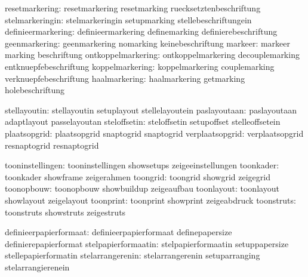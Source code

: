                resetmarkering:  resetmarkering               resetmarking
                                ruecksetztenbeschriftung
              stelmarkeringin:  stelmarkeringin              setupmarking
                                stellebeschriftungein
           definieermarkering:  definieermarkering           definemarking
                                definierebeschriftung
                geenmarkering:  geenmarkering                nomarking
                                keinebeschriftung
                      markeer:  markeer                      marking
                                beschriftung
           ontkoppelmarkering:  ontkoppelmarkering           decouplemarking
                                entknuepfebeschriftung
              koppelmarkering:  koppelmarkering              couplemarking
                                verknuepfebeschriftung
                haalmarkering:  haalmarkering                getmarking
                                holebeschriftung

                 stellayoutin:  stellayoutin                 setuplayout
                                stellelayoutein
                 paslayoutaan:  paslayoutaan                 adaptlayout
                                passelayoutan
                 steloffsetin:  steloffsetin                 setupoffset
                                stelleoffsetein
                 plaatsopgrid:  plaatsopgrid                 snaptogrid
                                snaptogrid %
              verplaatsopgrid:  verplaatsopgrid              resnaptogrid
                                resnaptogrid  %

             tooninstellingen:  tooninstellingen             showsetups
                                zeigeeinstellungen
                    toonkader:  toonkader                    showframe
                                zeigerahmen
                     toongrid:  toongrid                     showgrid
                                zeigegrid  
                   toonopbouw:  toonopbouw                   showbuildup
                                zeigeaufbau
                   toonlayout:  toonlayout                   showlayout
                                zeigelayout
                    toonprint:  toonprint                    showprint 
                                zeigeabdruck %
                   toonstruts:  toonstruts                   showstruts
                                zeigestruts

       definieerpapierformaat:  definieerpapierformaat       definepapersize
                                definierepapierformat
          stelpapierformaatin:  stelpapierformaatin          setuppapersize
                                stellepapierformatin
             stelarrangerenin:  stelarrangerenin             setuparranging
                                stelarrangierenein %


